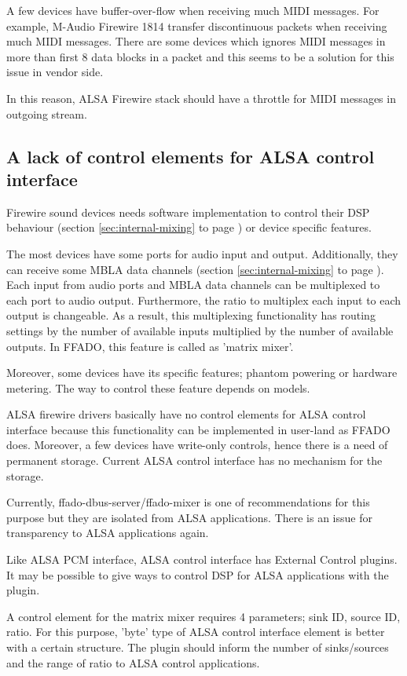 \documentclass[onecolumn]{article}
\begin{document}
A few devices have buffer-over-flow when receiving much MIDI messages. For example, M-Audio Firewire 1814 transfer discontinuous packets when receiving much MIDI messages. There are some devices which ignores MIDI messages in more than first 8 data blocks in a packet and this seems to be a solution for this issue in vendor side.

In this reason, ALSA Firewire stack should have a throttle for MIDI messages in outgoing stream.

\subsection{A lack of control elements for ALSA control interface}

Firewire sound devices needs software implementation to control their DSP behaviour (section \ref{sec:internal-mixing} to page \pageref{sec:internal-mixing}) or device specific features.

The most devices have some ports for audio input and output. Additionally, they can receive some MBLA data channels (section \ref{sec:internal-mixing} to page \pageref{sec:internal-mixing}). Each input from audio ports and MBLA data channels can be multiplexed to each port to audio output. Furthermore, the ratio to multiplex each input to each output is changeable. As a result, this multiplexing functionality has routing settings by the number of available inputs multiplied by the number of available outputs. In FFADO, this feature is called as 'matrix mixer'.

Moreover, some devices have its specific features; phantom powering or hardware metering. The way to control these feature depends on models.

ALSA firewire drivers basically have no control elements for ALSA control interface because this functionality can be implemented in user-land as FFADO does. Moreover, a few devices have write-only controls, hence there is a need of permanent storage. Current ALSA control interface has no mechanism for the storage.

Currently, ffado-dbus-server/ffado-mixer is one of recommendations for this purpose but they are isolated from ALSA applications. There is an issue for transparency to ALSA applications again.

Like ALSA PCM interface, ALSA control interface has External Control plugins. It may be possible to give ways to control DSP for ALSA applications with the plugin.

A control element for the matrix mixer requires 4 parameters; sink ID, source ID, ratio. For this purpose, 'byte' type of ALSA control interface element is better with a certain structure. The plugin should inform the number of sinks/sources and the range of ratio to ALSA control applications.
\end{document}
